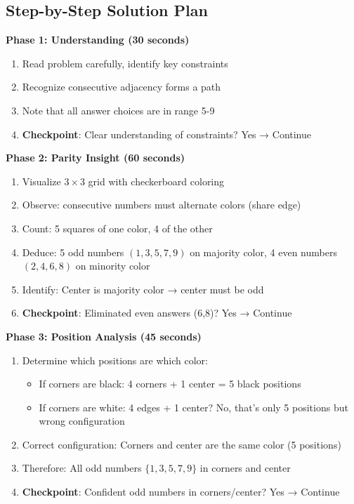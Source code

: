 \documentclass[11pt]{article}
\begin{document}
\begin{roadmapbox}
\subsection*{Step-by-Step Solution Plan}

\textbf{Phase 1: Understanding (30 seconds)}
\begin{enumerate}[leftmargin=*]
    \item Read problem carefully, identify key constraints
    \item Recognize consecutive adjacency forms a path
    \item Note that all answer choices are in range 5-9
    \item \textbf{Checkpoint}: Clear understanding of constraints? Yes → Continue
\end{enumerate}

\textbf{Phase 2: Parity Insight (60 seconds)}
\begin{enumerate}[leftmargin=*]
    \item Visualize $3\times3$ grid with checkerboard coloring
    \item Observe: consecutive numbers must alternate colors (share edge)
    \item Count: 5 squares of one color, 4 of the other
    \item Deduce: 5 odd numbers $(1,3,5,7,9)$ on majority color, 4 even numbers $(2,4,6,8)$ on minority color
    \item Identify: Center is majority color → center must be odd
    \item \textbf{Checkpoint}: Eliminated even answers (6,8)? Yes → Continue
\end{enumerate}

\textbf{Phase 3: Position Analysis (45 seconds)}
\begin{enumerate}[leftmargin=*]
    \item Determine which positions are which color:
    \begin{itemize}
        \item If corners are black: 4 corners + 1 center = 5 black positions
        \item If corners are white: 4 edges + 1 center? No, that's only 5 positions but wrong configuration
    \end{itemize}
    \item Correct configuration: Corners and center are the same color (5 positions)
    \item Therefore: All odd numbers $\{1,3,5,7,9\}$ in corners and center
    \item \textbf{Checkpoint}: Confident odd numbers in corners/center? Yes → Continue
\end{enumerate}


\end{roadmapbox}
\end{document}
